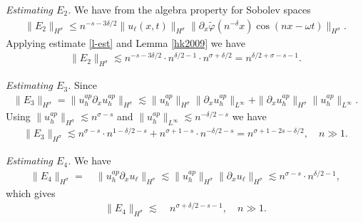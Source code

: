\documentclass[reqno]{amsart}
\theoremstyle{plain}
\numberwithin{equation}{section}
\begin{document}
  
 {\em Estimating $E_2$.}
 We have from the algebra property for Sobolev spaces 
   \begin{align}
 \| E_2 \|_{H^\sigma} \le  n^{-s-3\delta/2}  \| u_\ell(x,t) \|_{H^\sigma}  \|    \partial_x \widetilde \varphi (n^{-\delta }x) \cos(nx-\omega t)\|_{H^\sigma}   .
 \end{align}
 Applying estimate \eqref{l-est} and Lemma \ref{hk2009} we have
   \begin{align}
 \| E_2 \|_{H^\sigma} \lesssim  n^{-s-3\delta/2}   \cdot n^{ \delta/2-1} \cdot n^{\sigma +\delta/2}    = n^{\delta/2 + \sigma-s-1} .
 \end{align}
 
 
 {\em Estimating $E_3$.}
Since 
   \begin{align}
 \| E_3 \|_{H^\sigma}  
 =  \| u_h^{ap} \partial_x  u_h^{ap}  \|_{H^\sigma} 
 \lesssim 
  \| u_h^{ap}\|_{H^\sigma}  \|  \partial_x  u_h^{ap}  \|_{L^\infty}  +   \| \partial_x u_h^{ap}\|_{H^\sigma}  \|     u_h^{ap}  \|_{L^\infty}  
  .
 \end{align}
 Using $  \| u_h^{ap}\|_{H^\sigma} \lesssim n^{\sigma -s}$ and $  \|     u_h^{ap}  \|_{L^\infty}  \lesssim n^{-\delta/2-s}$ we have 
   \begin{align}
 \| E_3 \|_{H^\sigma}  
\lesssim  n^{\sigma -s} \cdot n^{1 -\delta/2-s} + n^{\sigma+1 -s} \cdot n^{-\delta/2-s}  = n^{\sigma+1 -2s-\delta/2},  \quad n\gg 1 
  .
 \end{align}
 
 
 
 
 {\em Estimating $E_4$.}
 We have 
    \begin{align*}
 \| E_4 \|_{H^\sigma}  
 = \ &  \|  u_h^{ap} \partial_x u_\ell    \|_{H^\sigma} 
 \lesssim 
  \| u_h^{ap}\|_{H^\sigma}  \|  \partial_x u_\ell    \|_{H^\sigma}   
  \lesssim n^{\sigma -s } \cdot n^{\delta/2-1} 
  ,
 \end{align*}
 which gives 
     \begin{align}
 \| E_4 \|_{H^\sigma}  
 \lesssim\ &  n^{\sigma +\delta/2  -s-1  } 
  , \quad n\gg 1 . 
 \end{align}
 
\end{document}
